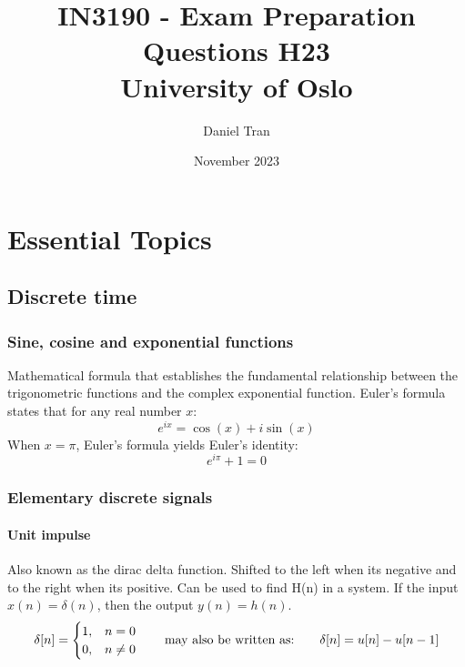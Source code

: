 \documentclass{article}
\begin{document}
\title{IN3190 - Exam Preparation Questions H23\\
{\Large University of Oslo}}
\author{Daniel Tran}
\date{November 2023}
\maketitle
\hypersetup{linkcolor=black}
\tableofcontents
\clearpage

\section{Essential Topics}
\subsection{Discrete time}
\subsubsection{Sine, cosine and exponential functions}

    Mathematical formula that establishes the fundamental relationship between the trigonometric functions and the complex exponential function. \newline
    Euler's formula states that for any real number $x$:
    \begin{equation}
        e^{ix} = \cos(x) + i\sin(x)
    \end{equation}
    When $x = \pi$, Euler's formula yields Euler's identity:
    \begin{equation}
        e^{i\pi} + 1 = 0
    \end{equation}
\subsubsection{Elementary discrete signals}
\paragraph{Unit impulse} %
Also known as the dirac delta function. Shifted to the left when its negative and to the right when its positive. Can be used to find H(n) in a system. If the input $x(n) = \delta(n)$, then the output $y(n) = h(n)$.
\begin{equation}
    \delta[n] = \begin{cases}
        1, & n = 0 \\
        0, & n \neq 0
    \end{cases}
    \hspace*{20pt}\text{may also be written as:}
    \hspace*{20pt} \delta[n] = u[n] - u[n-1]
\end{equation}
\end{document}
